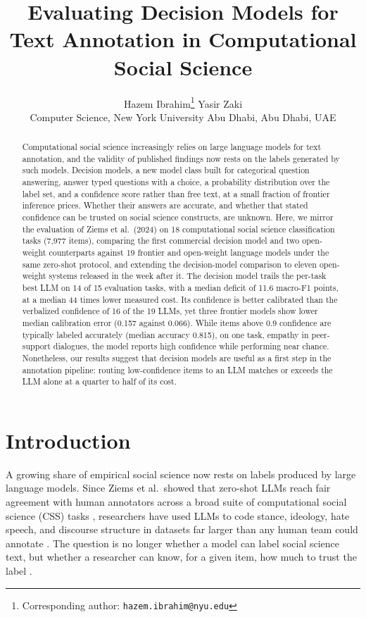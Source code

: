 \documentclass[11pt]{article}
\title{Evaluating Decision Models for Text Annotation in Computational Social Science}
\author{Hazem Ibrahim\thanks{Corresponding author: \texttt{hazem.ibrahim@nyu.edu}} \quad Yasir Zaki\\[4pt]
Computer Science, New York University Abu Dhabi, Abu Dhabi, UAE}
\date{}
\begin{document}
\maketitle

\begin{abstract}
Computational social science increasingly relies on large language models for text annotation, and the validity of published findings now rests on the labels generated by such models. Decision models, a new model class built for categorical question answering, answer typed questions with a choice, a probability distribution over the label set, and a confidence score rather than free text, at a small fraction of frontier inference prices. Whether their answers are accurate, and whether that stated confidence can be trusted on social science constructs, are unknown. Here, we mirror the evaluation of Ziems et al.\ (2024) on 18 computational social science classification tasks (7{,}977 items), comparing the first commercial decision model and two open-weight counterparts against 19 frontier and open-weight language models under the same zero-shot protocol, and extending the decision-model comparison to eleven open-weight systems released in the week after it. The decision model trails the per-task best LLM on 14 of 15 evaluation tasks, with a median deficit of 11.6 macro-F1 points, at a median 44 times lower measured cost. Its confidence is better calibrated than the verbalized confidence of 16 of the 19 LLMs, yet three frontier models show lower median calibration error (0.157 against 0.066). While items above 0.9 confidence are typically labeled accurately (median accuracy 0.815), on one task, empathy in peer-support dialogues, the model reports high confidence while performing near chance. Nonetheless, our results suggest that decision models are useful as a first step in the annotation pipeline: routing low-confidence items to an LLM matches or exceeds the LLM alone at a quarter to half of its cost.
\end{abstract}

\section{Introduction}

A growing share of empirical social science now rests on labels produced by large language models. Since Ziems et al.\ showed that zero-shot LLMs reach fair agreement with human annotators across a broad suite of computational social science (CSS) tasks \citep{ziems2024llms}, researchers have used LLMs to code stance, ideology, hate speech, and discourse structure in datasets far larger than any human team could annotate \citep{gilardi2023chatgpt, tornberg2023chatgpt}. The question is no longer whether a model can label social science text, but whether a researcher can know, for a given item, how much to trust the label \citep{pangakis2023automated}.
\end{document}
